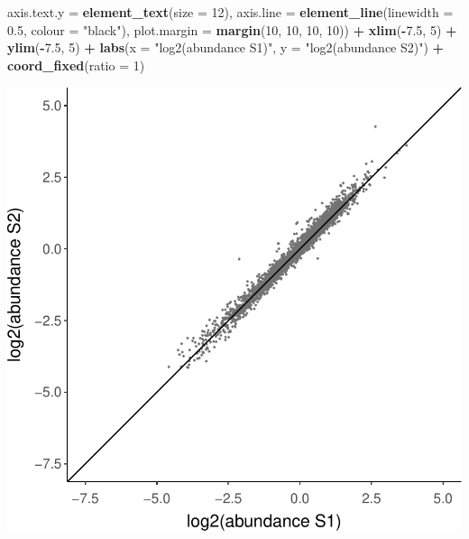 \documentclass[9pt,a4paper,]{extarticle}
\newenvironment{Shaded}{\begin{snugshade}}{\end{snugshade}}
\newcommand{\AttributeTok}[1]{\textcolor[rgb]{0.13,0.29,0.53}{#1}}
\newcommand{\DecValTok}[1]{\textcolor[rgb]{0.00,0.00,0.81}{#1}}
\newcommand{\FloatTok}[1]{\textcolor[rgb]{0.00,0.00,0.81}{#1}}
\newcommand{\FunctionTok}[1]{\textcolor[rgb]{0.13,0.29,0.53}{\textbf{#1}}}
\newcommand{\NormalTok}[1]{#1}
\newcommand{\SpecialCharTok}[1]{\textcolor[rgb]{0.81,0.36,0.00}{\textbf{#1}}}
\newcommand{\StringTok}[1]{\textcolor[rgb]{0.31,0.60,0.02}{#1}}
\begin{document}
\begin{Shaded}
\begin{Highlighting}[]
        \AttributeTok{axis.text.y =} \FunctionTok{element\_text}\NormalTok{(}\AttributeTok{size =} \DecValTok{12}\NormalTok{),}
        \AttributeTok{axis.line =} \FunctionTok{element\_line}\NormalTok{(}\AttributeTok{linewidth =} \FloatTok{0.5}\NormalTok{, }\AttributeTok{colour =} \StringTok{"black"}\NormalTok{),}
        \AttributeTok{plot.margin =} \FunctionTok{margin}\NormalTok{(}\DecValTok{10}\NormalTok{, }\DecValTok{10}\NormalTok{, }\DecValTok{10}\NormalTok{, }\DecValTok{10}\NormalTok{)) }\SpecialCharTok{+}
  \FunctionTok{xlim}\NormalTok{(}\SpecialCharTok{{-}}\FloatTok{7.5}\NormalTok{, }\DecValTok{5}\NormalTok{) }\SpecialCharTok{+}
  \FunctionTok{ylim}\NormalTok{(}\SpecialCharTok{{-}}\FloatTok{7.5}\NormalTok{, }\DecValTok{5}\NormalTok{) }\SpecialCharTok{+}
  \FunctionTok{labs}\NormalTok{(}\AttributeTok{x =} \StringTok{"log2(abundance S1)"}\NormalTok{, }\AttributeTok{y =} \StringTok{"log2(abundance S2)"}\NormalTok{) }\SpecialCharTok{+}
  \FunctionTok{coord\_fixed}\NormalTok{(}\AttributeTok{ratio =} \DecValTok{1}\NormalTok{)}
\end{Highlighting}
\end{Shaded}

\begin{center}\includegraphics[height=0.3\textheight]{workflow_expressions_files/figure-latex/correlation_plot_2-1} \end{center}
\end{document}
